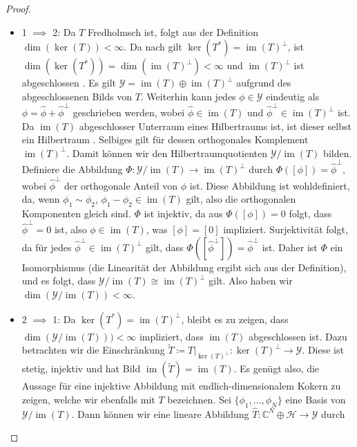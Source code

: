 \documentclass[11pt, hidelinks]{article}
\newcommand{\h}{\mathcal{H}}
\newcommand{\im}{\operatorname{im}}
\numberwithin{conj}{section}
\begin{document}
\begin{proof}\noindent
\begin{itemize}
    \item 1 $\implies$ 2: Da $T$ Fredholmsch ist, folgt aus der Definition $\dim(\ker(T)) < \infty$. Da nach \cite[Lemma 2.23]{lechner} gilt $\ker(T^\ast) = \im(T)^\perp$, ist $\dim(\ker(T^\ast)) = \dim(\im(T)^\perp) < \infty$ und $\im(T)^\perp$ ist abgeschlossen \cite[Lemma 2.4]{lechner}. Es gilt \( \mathcal{Y} = \im(T) \oplus \im(T)^\perp \) aufgrund des abgeschlossenen Bilds von $T$. Weiterhin kann jedes \( \phi \in \mathcal{Y} \) eindeutig als \( \phi = \hat{\phi} + \hat{\phi}^\perp \) geschrieben werden, wobei \( \hat{\phi} \in \im(T) \) und \( \hat{\phi}^\perp \in \im(T)^\perp \) ist. Da $\im(T)$ abgeschlosser Unterraum eines Hilbertraums ist, ist dieser selbst ein Hilbertraum \cite[Satz 4.7]{werner2018funktionalanalysis}. Selbiges gilt für dessen orthogonales Komplement $\im(T)^\perp$. Damit können wir den Hilbertraumquotienten $\mathcal{Y} / \im(T)$ bilden. Definiere die Abbildung \( \Phi: \mathcal{Y} / \im(T) \to \im(T)^\perp \) durch \( \Phi([\phi]) = \hat{\phi}^\perp \), wobei \( \hat{\phi}^\perp \) der orthogonale Anteil von \( \phi \) ist. Diese Abbildung ist wohldefiniert, da, wenn \( \phi_1 \sim \phi_2 \), \( \phi_1 - \phi_2 \in \im(T) \) gilt, also die orthogonalen Komponenten gleich sind. \( \Phi \) ist injektiv, da aus \( \Phi([\phi]) = 0 \) folgt, dass \( \hat{\phi}^\perp = 0 \) ist, also \( \phi \in \im(T) \), was \( [\phi] = [0] \) impliziert. Surjektivität folgt, da für jedes \( \hat{\phi}^\perp \in \im(T)^\perp \) gilt, dass \( \Phi([\hat{\phi}^\perp]) = \hat{\phi}^\perp \) ist. Daher ist \( \Phi \) ein Isomorphismus (die Linearität der Abbildung ergibt sich aus der Definition), und es folgt, dass \( \mathcal{Y} / \im(T) \cong \im(T)^\perp \) gilt. Also haben wir $\dim(\mathcal{Y}/\im(T)) < \infty$.
    \item 2 $\implies$ 1: Da $\ker(T^\ast) = \im(T)^\perp$, bleibt es zu zeigen, dass $\dim(\mathcal{Y}/\im(T))) < \infty$ impliziert, dass $\im(T)$ abgeschlossen ist. Dazu betrachten wir die Einschränkung $\widetilde{T} \coloneq T\vert_{\ker(T)^\perp}: \ker(T)^\perp \rightarrow \mathcal{Y}$. Diese ist stetig, injektiv und hat Bild $\im(\widetilde{T}) = \im(T)$. Es genügt also, die Aussage für eine injektive Abbildung mit endlich-dimensionalem Kokern zu zeigen, welche wir ebenfalls mit $T$ bezeichnen. Sei $\{\phi_1, \ldots, \phi_N\}$ eine Basis von $\mathcal{Y}/\im(T)$. Dann können wir eine lineare Abbildung $\hat{T}: \mathbb{C}^N \oplus \h \to \mathcal{Y}$ durch

\end{itemize}
\end{proof}
\end{document}
